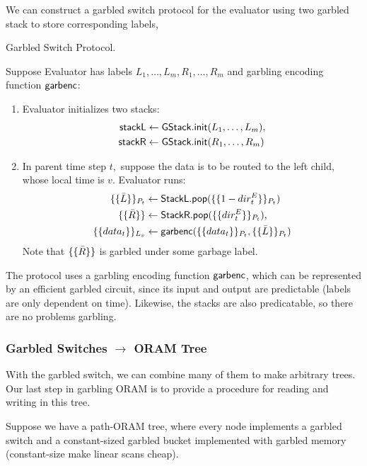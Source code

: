 We can construct a garbled switch protocol for the evaluator using two garbled stack to store corresponding labels,
\begin{mdframed}[innertopmargin=5pt, skipabove=\topskip, skipbelow=\topskip,align=left,nobreak=true]
Garbled Switch Protocol. 

Suppose Evaluator has labels $L_1,\dots,L_m,R_1,\dots,R_m$ and garbling encoding function $\mathsf{garbenc}$:
\begin{enumerate}
    \item Evaluator initializes two stacks:
    \begin{align*}
        \mathsf{stackL} &\leftarrow \mathsf{GStack.init}(L_1,\dots,L_m),\\
        \mathsf{stackR} &\leftarrow \mathsf{GStack.init}(R_1,\dots,R_m)
    \end{align*}
    \item In parent time step $t,$ suppose the data is to be routed to the left child, whose local time is $v.$ 
    Evaluator runs:
    \begin{align*}
    \{\{ \Bar{L}\}\}_{P_t} &\leftarrow \mathsf{StackL.pop}(\{\{ 1 - dir^E_t\}\}_{P_t}) \\
    \{\{ \Bar{R}\}\} &\leftarrow \mathsf{StackR.pop}(\{\{ dir^E_t\}\}_{P_t}),\\
    \{\{ data_t\}\}_{L_v} &\leftarrow \mathsf{garbenc}(\{\{ data_t\}\}_{P_t},\{\{ \Bar{L}\}\}_{P_t})
    \end{align*}    
    Note that $\{\{ \Bar{R}\}\}$ is garbled under some garbage label.
    \end{enumerate}
\end{mdframed}
The protocol uses a garbling encoding function $\mathsf{garbenc}$, which can be represented by an efficient garbled circuit, since its input and output are predictable (labels are only dependent on time). 
Likewise, the stacks are also predicatable, so there are no problems garbling.

\subsubsection{Garbled Switches $\rightarrow$ ORAM Tree}
With the garbled switch, we can combine many of them to make arbitrary trees. 
Our last step in garbling ORAM is to provide a procedure for reading and writing in this tree.

Suppose we have a path-ORAM tree, where every node implements a garbled switch and a constant-sized garbled bucket implemented with garbled memory (constant-size make linear scans cheap).


